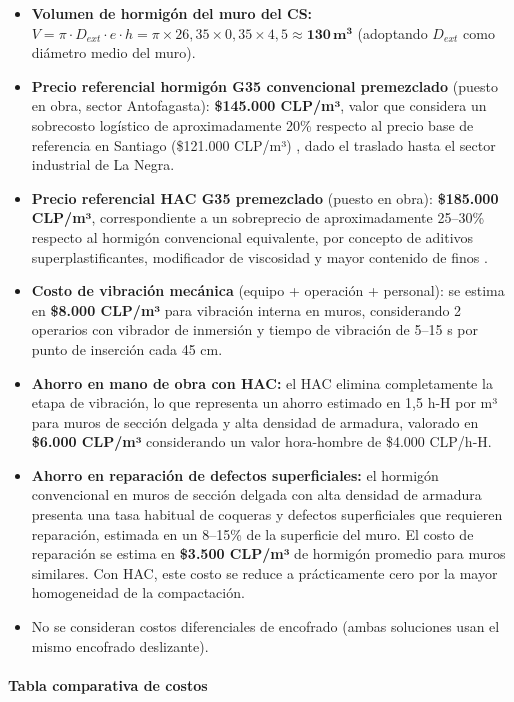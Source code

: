 \begin{itemize}
    \item \textbf{Volumen de hormigón del muro del CS:} $V = \pi \cdot D_{ext} \cdot e \cdot h = \pi \times 26{,}35 \times 0{,}35 \times 4{,}5 \approx \mathbf{130\,m^3}$ (adoptando $D_{ext}$ como diámetro medio del muro).
    \item \textbf{Precio referencial hormigón G35 convencional premezclado} (puesto en obra, sector Antofagasta): \textbf{\$145.000 CLP/m³}, valor que considera un sobrecosto logístico de aproximadamente 20\% respecto al precio base de referencia en Santiago (\$121.000 CLP/m³) \cite{CITAR_PRECIO_HORMIGON}, dado el traslado hasta el sector industrial de La Negra.
    \item \textbf{Precio referencial HAC G35 premezclado} (puesto en obra): \textbf{\$185.000 CLP/m³}, correspondiente a un sobreprecio de aproximadamente 25--30\% respecto al hormigón convencional equivalente, por concepto de aditivos superplastificantes, modificador de viscosidad y mayor contenido de finos \cite{CITAR_PRECIO_HAC}.
    \item \textbf{Costo de vibración mecánica} (equipo + operación + personal): se estima en \textbf{\$8.000 CLP/m³} para vibración interna en muros, considerando 2 operarios con vibrador de inmersión y tiempo de vibración de 5--15 s por punto de inserción cada 45 cm.
    \item \textbf{Ahorro en mano de obra con HAC:} el HAC elimina completamente la etapa de vibración, lo que representa un ahorro estimado en 1{,}5 h-H por m³ para muros de sección delgada y alta densidad de armadura, valorado en \textbf{\$6.000 CLP/m³} considerando un valor hora-hombre de \$4.000 CLP/h-H.
    \item \textbf{Ahorro en reparación de defectos superficiales:} el hormigón convencional en muros de sección delgada con alta densidad de armadura presenta una tasa habitual de coqueras y defectos superficiales que requieren reparación, estimada en un 8--15\% de la superficie del muro. El costo de reparación se estima en \textbf{\$3.500 CLP/m³} de hormigón promedio para muros similares. Con HAC, este costo se reduce a prácticamente cero por la mayor homogeneidad de la compactación.
    \item No se consideran costos diferenciales de encofrado (ambas soluciones usan el mismo encofrado deslizante).
\end{itemize}

\paragraph{Tabla comparativa de costos}

